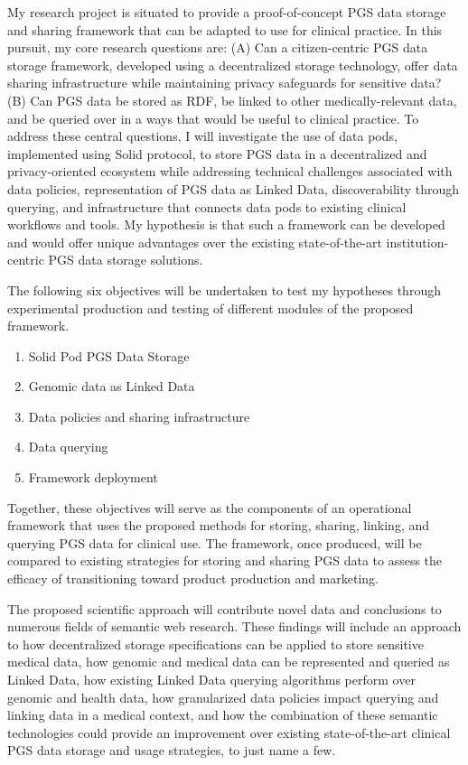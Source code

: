 \documentclass[runningheads]{llncs}
\begin{document}
My research project is situated to provide a proof-of-concept PGS data storage and sharing framework that can be adapted to use for clinical practice. 
In this pursuit, my core research questions are: 
(A) Can a citizen-centric PGS data storage framework, developed using a decentralized storage technology, offer data sharing infrastructure while maintaining privacy safeguards for sensitive data? 
(B) Can PGS data be stored as RDF, be linked to other medically-relevant data, and be queried over in a ways that would be useful to clinical practice.
To address these central questions, I will investigate the use of data pods, implemented using Solid protocol, to store PGS data in a decentralized and privacy-oriented ecosystem while addressing technical challenges associated with data policies, representation of PGS data as Linked Data, discoverability through querying, and infrastructure that connects data pods to existing clinical workflows and tools. 
My hypothesis is that such a framework can be developed and would offer unique advantages over the existing state-of-the-art institution-centric PGS data storage solutions. 

The following six objectives will be undertaken to test my hypotheses through experimental production and testing of different modules of the proposed framework.
\begin{enumerate}
    \item Solid Pod PGS Data Storage
    \item Genomic data as Linked Data
    \item Data policies and sharing infrastructure
    \item Data querying
    \item Framework deployment
\end{enumerate}

Together, these objectives will serve as the components of an operational framework that uses the proposed methods for storing, sharing, linking, and querying PGS data for clinical use. The framework, once produced, will be compared to existing strategies for storing and sharing PGS data to assess the efficacy of transitioning toward product production and marketing.

The proposed scientific approach will contribute novel data and conclusions to numerous fields of semantic web research. These findings will include an approach to how decentralized storage specifications can be applied to store sensitive medical data, how genomic and medical data can be represented and queried as Linked Data, how existing Linked Data querying algorithms perform over genomic and health data, how granularized data policies impact querying and linking data in a medical context, and how the combination of these semantic technologies could provide an improvement over existing state-of-the-art clinical PGS data storage and usage strategies, to just name a few.
\end{document}
